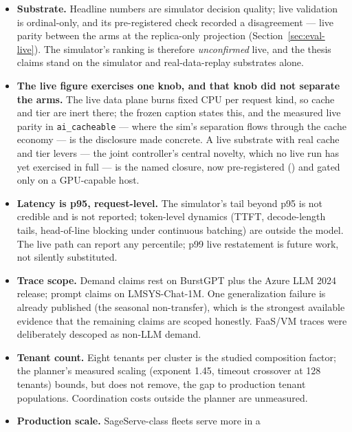 \begin{itemize}
  \item \textbf{Substrate.} Headline numbers are simulator decision quality;
        live validation is ordinal-only, and its pre-registered check
        recorded a disagreement --- live parity between the arms at the
        replica-only projection (Section~\ref{sec:eval-live}). The
        simulator's ranking is therefore \emph{unconfirmed} live, and the
        thesis claims stand on the simulator and real-data-replay substrates
        alone.
  \item \textbf{The live figure exercises one knob, and that knob did not
        separate the arms.} The live data plane burns fixed CPU per request
        kind, so cache and tier are inert there; the frozen caption states
        this, and the measured live parity in \texttt{ai\_cacheable} ---
        where the sim's separation flows through the cache economy --- is
        the disclosure made concrete. A live substrate with real cache and
        tier levers --- the joint controller's central novelty, which no live
        run has yet exercised in full --- is the named closure, now
        pre-registered
        () and gated
        only on a GPU-capable host.
  \item \textbf{Latency is p95, request-level.} The simulator's tail beyond
        p95 is not credible and is not reported; token-level dynamics (TTFT,
        decode-length tails, head-of-line blocking under continuous
        batching) are outside the model. The live path can report any
        percentile; p99 live restatement is future work, not silently
        substituted.
  \item \textbf{Trace scope.} Demand claims rest on BurstGPT plus the Azure
        LLM 2024 release; prompt claims on LMSYS-Chat-1M. One
        generalization failure is already published (the seasonal
        non-transfer), which is the strongest available evidence that the
        remaining claims are scoped honestly. FaaS/VM traces were
        deliberately descoped as non-LLM demand.
  \item \textbf{Tenant count.} Eight tenants per cluster is the studied
        composition factor; the planner's measured scaling (exponent 1.45,
        timeout crossover at 128 tenants) bounds, but does not remove, the
        gap to production tenant populations. Coordination costs outside
        the planner are unmeasured.
  \item \textbf{Production scale.} SageServe-class fleets serve more in a

\end{itemize}
